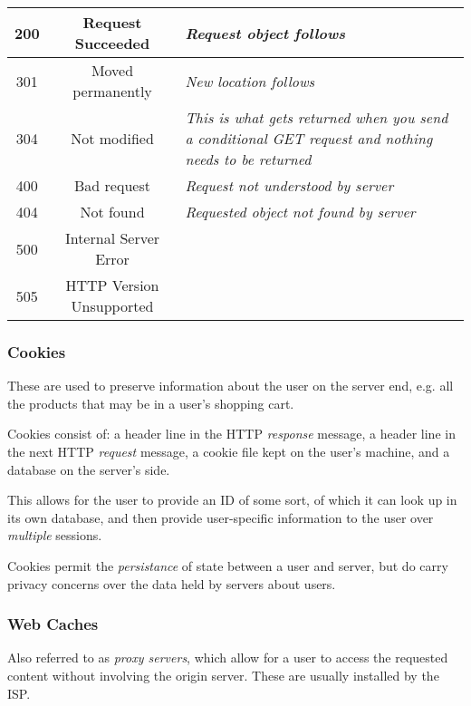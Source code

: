 \documentclass{article}
\begin{document}
\begin{center}
  \begin{tabular}{|c|c|p{4cm}|}
    \hline
    200 & Request Succeeded & \textit{Request object follows}\\
    \hline
    301 & Moved permanently & \textit{New location follows}\\
    \hline
    304 & Not modified & \textit{This is what gets returned when you send a conditional GET request and nothing needs to be returned}\\
    \hline
    400 & Bad request & \textit{Request not understood by server}\\
    \hline
    404 & Not found & \textit{Requested object not found by server}\\
    \hline
    500 & Internal Server Error & \\
    \hline
    505 & HTTP Version Unsupported & \\
    \hline
  \end{tabular}
\end{center}

\subsubsection{Cookies}

These are used to preserve information about the user on the server end, e.g. all the products that may be in a user's shopping cart.

Cookies consist of: a header line in the HTTP \textit{response} message, a header line in the next HTTP \textit{request} message, a cookie file kept on the user's machine, and a database on the server's side.

This allows for the user to provide an ID of some sort, of which it can look up in its own database, and then provide user-specific information to the user over \textit{multiple} sessions.

Cookies permit the \textit{persistance} of state between a user and server, but do carry privacy concerns over the data held by servers about users.

\subsubsection{Web Caches}

Also referred to as \textit{proxy servers}, which allow for a user to access the requested content without involving the origin server. These are usually installed by the ISP.
\end{document}
